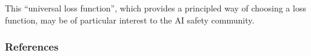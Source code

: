 \documentclass[twoside]{article}
\theoremstyle{plain}
\theoremstyle{definition}
\begin{document}

This ``universal loss function'',
which provides a principled way of choosing a loss function, 
may be of particular interest to the AI safety community.




\subsubsection*{References}

\end{document}
